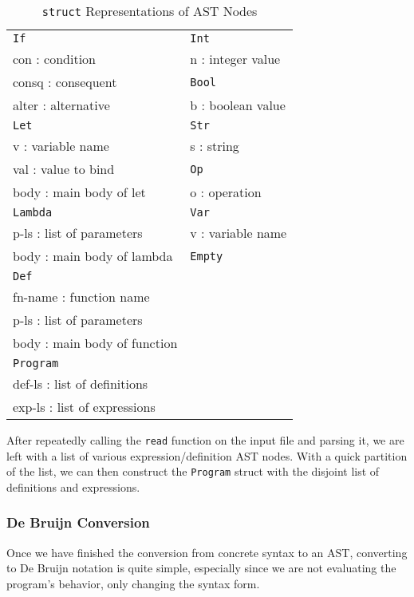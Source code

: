 \documentclass[12pt]{article}
\newcommand{\tab}{\hspace{6mm}}
\newcommand{\key}[1]{\texttt{#1}}
\begin{document}
\begin{table}[H]
  \begin{mdframed}
    \begin{tabular}{ll}
      \key{If} & \key{Int} \\
      \tab con : condition & \tab n : integer value \\
      \tab consq : consequent & \key{Bool} \\
      \tab alter : alternative & \tab b : boolean value \\
      \key{Let} & \key{Str} \\
      \tab v : variable name & \tab s : string \\
      \tab val : value to bind & \key{Op} \\
      \tab body : main body of let & \tab o : operation \\
      \key{Lambda} & \key{Var} \\
      \tab p-ls : list of parameters & \tab v : variable name \\
      \tab body : main body of lambda & \key{Empty} \\
      \key{Def} \\
      \tab fn-name : function name \\
      \tab p-ls : list of parameters \\
      \tab body : main body of function \\
      \key{Program} \\
      \tab def-ls : list of definitions \\
      \tab exp-ls : list of expressions
    \end{tabular}
  \end{mdframed}
  \caption{\key{struct} Representations of AST Nodes}
  \label{ast-structs}
\end{table}

After repeatedly calling the \key{read} function on the input file and parsing it, we are left with a list of various expression/definition AST nodes. With a quick partition of the list, we can then construct the \key{Program} struct with the disjoint list of definitions and expressions.

\subsubsection{De Bruijn Conversion}
Once we have finished the conversion from concrete syntax to an AST, converting to De Bruijn notation is quite simple, especially since we are not evaluating the program's behavior, only changing the syntax form.
\end{document}
